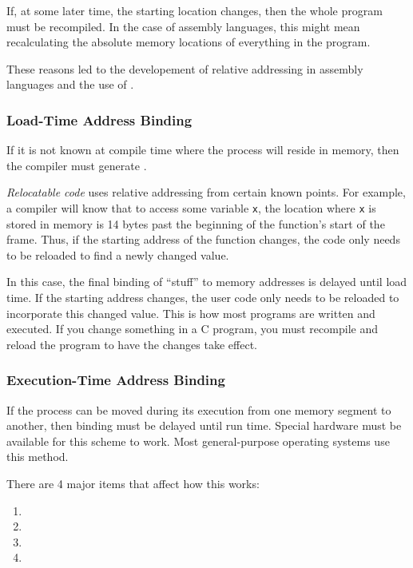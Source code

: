 If, at some later time, the starting location changes, then the whole program must be recompiled.
In the case of assembly languages, this might mean recalculating the absolute memory locations of everything in the program.

These reasons led to the developement of relative addressing in assembly languages and the use of .

\subsubsection{Load-Time Address Binding}\label{subsubsec:Load_Time_Address_Binding}
If it is not known at compile time where the process will reside in memory, then the compiler must generate .

\begin{definition}\label{def:Relocatable_Code}
  \emph{Relocatable code} uses relative addressing from certain known points.
  For example, a compiler will know that to access some variable \texttt{x}, the location where \texttt{x} is stored in memory is 14 bytes past the beginning of the function's start of the frame.
  Thus, if the starting address of the function changes, the code only needs to be reloaded to find a newly changed value.
\end{definition}

In this case, the final binding of ``stuff'' to memory addresses is delayed until load time.
If the starting address changes, the user code only needs to be reloaded to incorporate this changed value.
This is how most programs are written and executed.
If you change something in a C program, you must recompile and reload the program to have the changes take effect.

\subsubsection{Execution-Time Address Binding}\label{subsubsec:Execution_Time_Address_Binding}
If the process can be moved during its execution from one memory segment to another, then binding must be delayed until run time.
Special hardware must be available for this scheme to work.
Most general-purpose operating systems use this method.

There are 4 major items that affect how this works:
\begin{enumerate}[noitemsep]
\item {}
\item {}
\item {}
\item {}
\end{enumerate}


